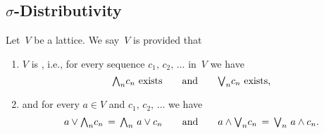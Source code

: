\documentclass[main.tex]{subfiles}
\begin{document}
\subsection{$\sigma$-Distributivity}
%
% 
\begin{dfn}
\label{D:sigma-distributive}
Let~$V$ be a lattice.
We say~$V$ is
provided that
\begin{enumerate}
\item
$V$ is , i.e.,
for every sequence $c_1,\,c_2,\,\dotsc$ in~$V$
we have 
\begin{equation*}
\text{ $\textstyle{\bigwedge}_n c_n$ exists\qquad and\qquad $\textstyle{\bigvee}_n c_n$ exists, }
\end{equation*}
\item
and for every  $a\in V$ and $c_1,\,c_2,\,\dotsc$
we have
\begin{equation*}
a \vee \textstyle{\bigwedge}_n c_n \,=\, \textstyle{\bigwedge}_n\  a\vee c_n
\qquad\text{and}\qquad
a \wedge \textstyle{\bigvee}_n c_n \,=\, \textstyle{\bigvee}_n\  a\wedge c_n.
\end{equation*}
\end{enumerate}
\end{dfn}
\end{document}
